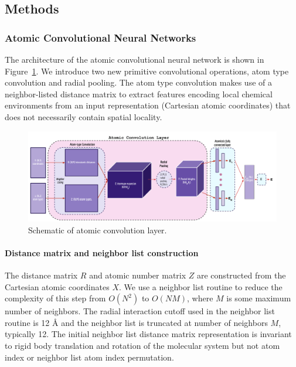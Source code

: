 \subsection{Methods}

\subsubsection{Atomic Convolutional Neural Networks}
The architecture of the atomic convolutional neural network is shown in Figure~\ref{fig:atomic_conv}.  We introduce two new primitive convolutional operations, atom type convolution and radial pooling. The atom type convolution makes use of a neighbor-listed distance matrix to extract features encoding local chemical environments from an input representation (Cartesian atomic coordinates) that does not necessarily contain spatial locality.
\begin{figure}
    \centering
    \includegraphics[width=\textwidth]{Images/Atomic_Conv_Diagram_rev3.png}
    \caption{Schematic of atomic convolution layer.}
    \label{fig:atomic_conv}
\end{figure}

\paragraph{Distance matrix and neighbor list construction}
The distance matrix $R$ and atomic number matrix $Z$ are constructed from the Cartesian atomic coordinates $X$.  We use a neighbor list routine \cite{yip1989neighbor} to reduce the complexity of this step from $O(N^2)$ to $O(NM)$, where $M$ is some maximum number of neighbors.  The radial interaction cutoff used in the neighbor list routine is 12 Å and the neighbor list is truncated at number of neighbors $M$, typically 12.  The initial neighbor list distance matrix representation is invariant to rigid body translation and rotation of the molecular system but not atom index or neighbor list atom index permutation.

